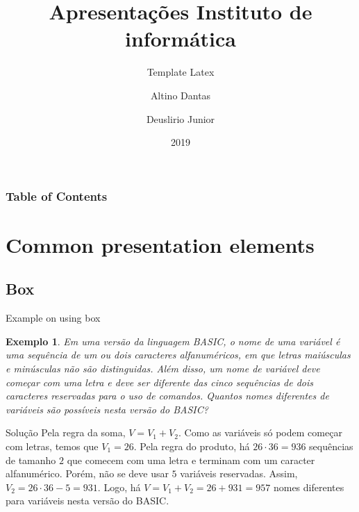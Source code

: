 \documentclass[aspectratio=169,t,xcolor=table]{beamer}
\newtheorem{ex}{Exemplo}
\begin{document}
\title[Inf UFG]{Apresentações Instituto de informática}
\subtitle{Template Latex}

\author{Altino Dantas \and Deuslirio Junior}

\date{2019}
\frame[noframenumbering]{\titlepage}



\begin{frame}
    \frametitle{Table of Contents}
    \tableofcontents
\end{frame}


\section{Common presentation elements}

\subsection{Box}

\begin{frame}{Example on using box}

    \footnotesize
    
    \begin{ex}
        Em uma versão da linguagem BASIC, o nome de uma variável é uma sequência de um ou dois caracteres alfanuméricos, em que letras maiúsculas e minúsculas não são distinguidas. Além disso, um nome de variável deve começar com uma letra e deve ser diferente das cinco sequências de dois caracteres reservadas para o uso de comandos. Quantos nomes diferentes de variáveis são possíveis nesta versão do BASIC?
    \end{ex}
    
    \begin{block}{Solução}
        Pela regra da soma, $V=V_1+V_2$. Como as variáveis só podem começar com letras, temos que $V_1=26$. Pela regra do produto, há $26\cdot 36=936$ sequências de tamanho $2$ que comecem com uma letra e terminam com um caracter alfanumérico. Porém, não se deve usar $5$ variáveis reservadas. Assim, $V_2=26\cdot 36-5=931$. Logo, há $V=V_1+V_2 = 26+931=957$ nomes diferentes para variáveis nesta versão do BASIC.
    \end{block}

\end{frame}
\end{document}
